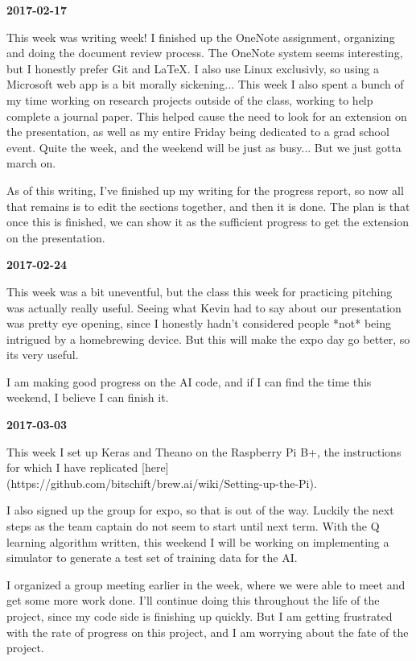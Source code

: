 \textbf{2017-02-17} 

This week was writing week! I finished up the OneNote assignment, organizing and doing the document review process.
The OneNote system seems interesting, but I honestly prefer Git and LaTeX. I also use Linux exclusivly, so using a Microsoft web app is a bit morally sickening...
This week I also spent a bunch of my time working on research projects outside of the class, working to help complete a journal paper. This helped cause the need to look for an extension on the presentation, as well as my entire Friday being dedicated to a grad school event. Quite the week, and the weekend will be just as busy... But we just gotta march on.

As of this writing, I've finished up my writing for the progress report, so now all that remains is to edit the sections together, and then it is done. The plan is that once this is finished, we can show it as the sufficient progress to get the extension on the presentation. 

\textbf{2017-02-24} 

This week was a bit uneventful, but the class this week for practicing pitching was actually really useful.
Seeing what Kevin had to say about our presentation was pretty eye opening, since I honestly hadn't considered people *not* being intrigued by a homebrewing device. But this will make the expo day go better, so its very useful.

I am making good progress on the AI code, and if I can find the time this weekend, I believe I can finish it.

\textbf{2017-03-03} 

This week I set up Keras and Theano on the Raspberry Pi B+, the instructions for which I have replicated [here](https://github.com/bitschift/brew.ai/wiki/Setting-up-the-Pi).

I also signed up the group for expo, so that is out of the way. Luckily the next steps as the team captain do not seem to start until next term. 
With the Q learning algorithm written, this weekend I will be working on implementing a simulator to generate a test set of training data for the AI.

I organized a group meeting earlier in the week, where we were able to meet and get some more work done. I'll continue doing this throughout the life of the project, since my code side is finishing up quickly. But I am getting frustrated with the rate of progress on this project, and I am worrying about the fate of the project.

